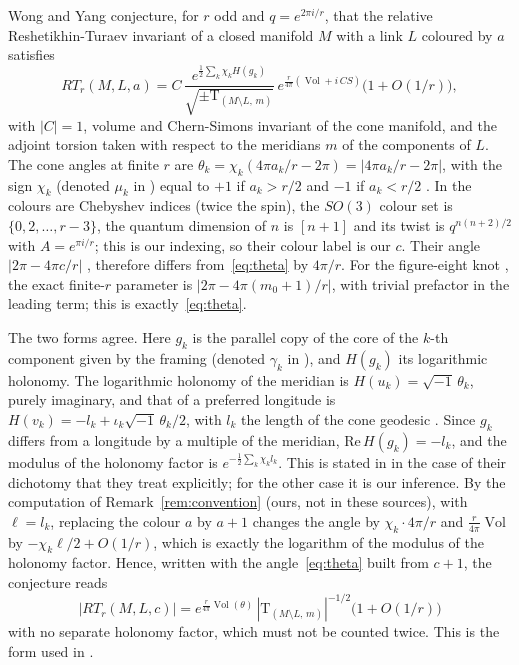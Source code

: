 \documentclass[11pt]{amsart}
\theoremstyle{definition}
\theoremstyle{remark}
\newcommand{\Vol}{\operatorname{Vol}}
\begin{document}
Wong and Yang \cite[Conj.~1.1]{WY2} conjecture, for $r$ odd and
$q = e^{2\pi i/r}$, that the relative Reshetikhin-Turaev invariant of a closed
manifold $M$ with a link $L$ coloured by $a$ satisfies
\[
RT_r(M, L, a) = C\,
\frac{e^{\frac12\sum_k \chi_k H(g_k)}}{\sqrt{\pm\mathrm{T}_{(M\setminus L,\,m)}}}\,
e^{\frac{r}{4\pi}(\Vol + i\,CS)}\big(1 + O(1/r)\big),
\]
with $|C| = 1$, volume and Chern-Simons invariant of the cone manifold, and the adjoint
torsion taken with respect to the meridians $m$ of the components of $L$. The cone
angles at finite $r$ are $\theta_k = \chi_k(4\pi a_k/r - 2\pi) = |4\pi a_k/r - 2\pi|$,
with the sign $\chi_k$ (denoted $\mu_k$ in \cite{WY2}) equal to $+1$ if $a_k > r/2$
and $-1$ if $a_k < r/2$ \cite[Sections~1.1 and~3.2]{WY2}. In \cite[Section~2.1,
(3.1)]{WY1} the colours are Chebyshev indices (twice the spin), the $SO(3)$ colour set
is $\{0, 2, \dots, r-3\}$, the quantum dimension of $n$ is $[n+1]$ and its twist is
$q^{n(n+2)/2}$ with $A = e^{\pi i/r}$; this is our indexing, so their colour label is
our $c$. Their angle $|2\pi - 4\pi c/r|$ \cite[Conj.~1.1]{WY1}, \cite{WY2} therefore
differs from~\eqref{eq:theta} by $4\pi/r$. For the figure-eight knot \cite[Prop.~3.1,
Sections~6 and~7.2]{WY1b}, the exact finite-$r$ parameter is
$|2\pi - 4\pi(m_0+1)/r|$, with trivial prefactor in the leading term; this is
exactly~\eqref{eq:theta}.

The two forms agree. Here $g_k$ is the parallel copy of the core of the $k$-th
component given by the framing (denoted $\gamma_k$ in \cite[Section~1.1]{WY2}), and
$H(g_k)$ its logarithmic holonomy. The logarithmic holonomy of the meridian is
$H(u_k) = \sqrt{-1}\,\theta_k$, purely imaginary, and that of a preferred longitude is
$H(v_k) = -l_k + \iota_k\sqrt{-1}\,\theta_k/2$, with $l_k$ the length of the cone
geodesic \cite[(3.2), (3.22), (3.29)]{WY2}. Since $g_k$ differs from a longitude
by a multiple of the meridian, $\mathrm{Re}\,H(g_k) = -l_k$, and the modulus of
the holonomy factor is $e^{-\frac12\sum_k \chi_k l_k}$. This is stated in \cite{WY2} in
the case of their dichotomy that they treat explicitly; for the other case it is our
inference. By the computation of Remark~\ref{rem:convention} (ours, not in these
sources), with $\ell = l_k$, replacing the colour $a$ by $a+1$ changes the angle by
$\chi_k\cdot 4\pi/r$ and $\frac{r}{4\pi}\Vol$ by $-\chi_k\ell/2 + O(1/r)$, which is
exactly the logarithm of the modulus of the holonomy factor. Hence, written with the
angle~\eqref{eq:theta} built from $c+1$, the conjecture reads
\[
|RT_r(M, L, c)| = e^{\frac{r}{4\pi}\Vol(\theta)}\,|\mathrm{T}_{(M\setminus L,\,m)}|^{-1/2}
\big(1 + O(1/r)\big)
\]
with no separate holonomy factor, which must not be counted twice. This is the form
used in \cite{WY1b}.
\end{document}

